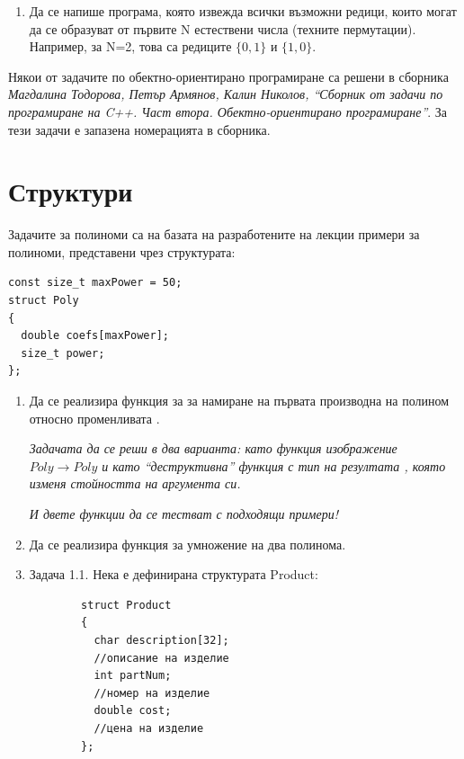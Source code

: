 {\begin{enumerate}[resume]
  \item Да се напише програма, която извежда всички възможни редици, които могат да се образуват от първите N естествени числа (техните пермутации). Например, за N=2, това са редиците $\{0,1\}$ и $\{1,0\}$.

\end{enumerate}


\pagebreak

\small{Някои от задачите по обектно-ориентирано програмиране са решени в сборника \cite{sbornik2}\textit{Магдалина Тодорова, Петър Армянов, Калин Николов, ``Сборник от задачи по програмиране на C++. Част втора. Обектно-ориентирано програмиране''}. За тези задачи е запазена номерацията в сборника.}

\pagebreak

\clearpage\section{Структури}

\begin{mdframed}[hidealllines=true,backgroundcolor=gray!20]
Задачите за полиноми са на базата на разработените на лекции примери за полиноми, представени чрез структурата:

\begin{verbatim}
const size_t maxPower = 50;
struct Poly
{
  double coefs[maxPower];
  size_t power;
};
\end{verbatim}
\end{mdframed}

\begin{enumerate}


  \item Да се реализира функция  за за намиране на първата производна на полином относно променливата .

  \emph{Задачата да се реши в два варианта: като функция изображение $Poly \rightarrow Poly$ и като ``деструктивна'' функция с тип на резултата , която изменя стойността на аргумента си.}

  \emph{И двете функции да се тестват с подходящи примери!}
  \item Да се реализира функция  за умножение на два полинома.

  \item Задача 1.1. \cite{sbornik2}  \label{zad:structproduct} Нека е дефинирана структурата Product:
	\begin{verbatim}
		struct Product
		{
		  char description[32];
		  //описание на изделие
		  int partNum;
		  //номер на изделие
		  double cost;
		  //цена на изделие
		};


\end{verbatim}
\end{enumerate}}
